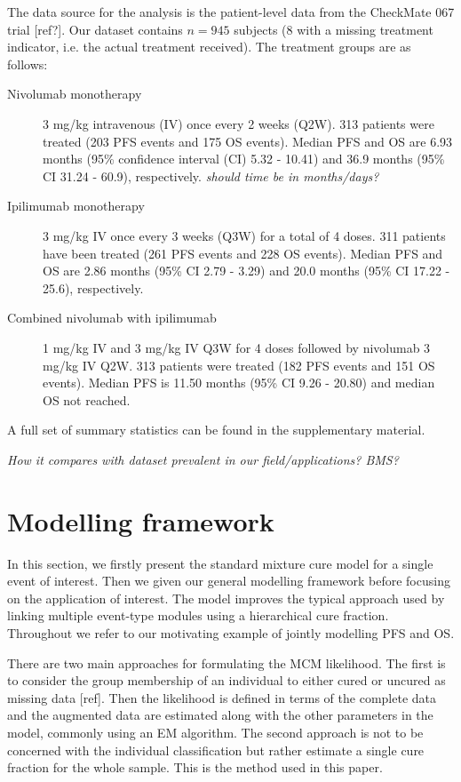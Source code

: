 \documentclass[AMA,STIX1COL]{WileyNJD-v2}
\begin{document}
The data source for the analysis is the patient-level data from the CheckMate 067 trial [ref?].
Our dataset contains $n = 945$ subjects (8 with a missing treatment indicator, i.e. the actual treatment received).
The treatment groups are as  follows:
\begin{description}
\item[Nivolumab monotherapy] 3 mg/kg intravenous (IV) once every 2 weeks (Q2W). 313 patients were treated (203 PFS events and 175 OS events).
Median PFS and OS are 6.93 months (95\% confidence interval (CI) 5.32 - 10.41) and 36.9 months (95\% CI 31.24 - 60.9), respectively. {\it should time be in months/days?}
\item[Ipilimumab monotherapy] 3 mg/kg IV once every 3 weeks (Q3W) for a total of 4 doses.
311 patients have been treated (261 PFS events and 228 OS events). Median PFS and OS are 2.86 months (95\% CI 2.79 - 3.29) and 20.0 months (95\% CI 17.22 - 25.6), respectively.
\item[Combined nivolumab with ipilimumab] 1 mg/kg IV and 3 mg/kg IV Q3W for 4 doses followed by nivolumab 3 mg/kg IV Q2W.
313 patients were treated (182 PFS events and 151 OS events). Median PFS is 11.50 months (95\% CI 9.26 - 20.80) and median OS not reached. 
\end{description}

A full set of summary statistics can be found in the supplementary material.

{\it How it compares with dataset prevalent in our field/applications? BMS?}

%
\section{Modelling framework}\label{sec:methods}
In this section, we firstly present the standard mixture cure model for a single event of interest.
Then we given our general modelling framework before focusing on the application of interest.
The model improves the typical approach used by linking multiple event-type modules using a hierarchical cure fraction.
Throughout we refer to our motivating example of jointly modelling PFS and OS.

There are two main approaches for formulating the MCM likelihood.
The first is to consider the group membership of an individual to either cured or uncured as missing data [ref].
Then the likelihood is defined in terms of the complete data and the augmented data are estimated along with the other parameters in the model, commonly using an EM algorithm.
The second approach is not to be concerned with the individual classification but rather estimate a single cure fraction for the whole sample.
This is the method used in this paper.
\end{document}
